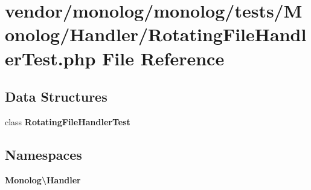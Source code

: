 \section{vendor/monolog/monolog/tests/\+Monolog/\+Handler/\+Rotating\+File\+Handler\+Test.php File Reference}
\label{_rotating_file_handler_test_8php}
\subsection*{Data Structures}
\begin{DoxyCompactItemize}
\item 
class {\bf Rotating\+File\+Handler\+Test}
\end{DoxyCompactItemize}
\subsection*{Namespaces}
\begin{DoxyCompactItemize}
\item 
 {\bf Monolog\textbackslash{}\+Handler}
\end{DoxyCompactItemize}

